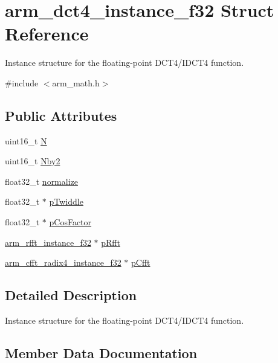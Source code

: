 \hypertarget{structarm__dct4__instance__f32}{}\section{arm\+\_\+dct4\+\_\+instance\+\_\+f32 Struct Reference}
\label{structarm__dct4__instance__f32}


Instance structure for the floating-\/point D\+C\+T4/\+I\+D\+C\+T4 function.  




{\ttfamily \#include $<$arm\+\_\+math.\+h$>$}

\subsection*{Public Attributes}
\begin{DoxyCompactItemize}
\item 
uint16\+\_\+t \hyperlink{structarm__dct4__instance__f32_a262b29a51c371b46efc89120e31ccf37}{N}
\item 
uint16\+\_\+t \hyperlink{structarm__dct4__instance__f32_adb1ef2739ddbe62e5cdadc47455a4147}{Nby2}
\item 
float32\+\_\+t \hyperlink{structarm__dct4__instance__f32_a61ce8c967b2e998a9c0041cca73cdef8}{normalize}
\item 
float32\+\_\+t $\ast$ \hyperlink{structarm__dct4__instance__f32_ad13544aafad268588c62e3eb35ae662c}{p\+Twiddle}
\item 
float32\+\_\+t $\ast$ \hyperlink{structarm__dct4__instance__f32_a6da1187e070801e011ce5e0582efa861}{p\+Cos\+Factor}
\item 
\hyperlink{structarm__rfft__instance__f32}{arm\+\_\+rfft\+\_\+instance\+\_\+f32} $\ast$ \hyperlink{structarm__dct4__instance__f32_a978f37fc19add31af243ab5c63ae502f}{p\+Rfft}
\item 
\hyperlink{structarm__cfft__radix4__instance__f32}{arm\+\_\+cfft\+\_\+radix4\+\_\+instance\+\_\+f32} $\ast$ \hyperlink{structarm__dct4__instance__f32_a018f7860b6e070af533fb7d76c7cdc32}{p\+Cfft}
\end{DoxyCompactItemize}


\subsection{Detailed Description}
Instance structure for the floating-\/point D\+C\+T4/\+I\+D\+C\+T4 function. 

\subsection{Member Data Documentation}
